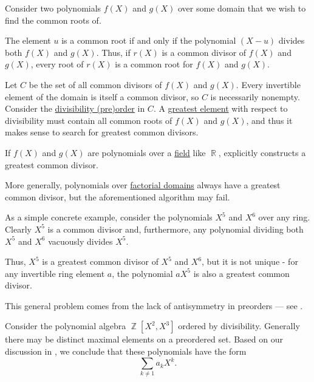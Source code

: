 \begin{example}\label{ex:common_polynomial_divisors}
  Consider two polynomials \( f(X) \) and \( g(X) \) over some domain that we wish to find the common roots of.

  The element \( u \) is a common root if and only if the polynomial \( (X - u) \) divides both \( f(X) \) and \( g(X) \). Thus, if \( r(X) \) is a common divisor of \( f(X) \) and \( g(X) \), every root of \( r(X) \) is a common root for \( f(X) \) and \( g(X) \).

  Let \( C \) be the set of all common divisors of \( f(X) \) and \( g(X) \). Every invertible element of the domain is itself a common divisor, so \( C \) is necessarily nonempty. Consider the \hyperref[thm:semiring_divisibility_order]{divisibility (pre)order} in \( C \). A \hyperref[def:extremal_points/greatest_and_least]{greatest element} with respect to divisibility must contain all common roots of \( f(X) \) and \( g(X) \), and thus it makes sense to search for greatest common divisors.

  \begin{thmenum}
     If \( f(X) \) and \( g(X) \) are polynomials over a \hyperref[def:field]{field} like \( \BbbR \),  explicitly constructs a greatest common divisor.

     More generally, polynomials over \hyperref[def:factorial_domain]{factorial domains} always have a greatest common divisor, but the aforementioned algorithm may fail.

     As a simple concrete example, consider the polynomials \( X^5 \) and \( X^6 \) over any ring. Clearly \( X^5 \) is a common divisor and, furthermore, any polynomial dividing both \( X^5 \) and \( X^6 \) vacuously divides \( X^5 \).

    Thus, \( X^5 \) is a greatest common divisor of \( X^5 \) and \( X^6 \), but it is not unique - for any invertible ring element \( a \), the polynomial \( a X^5 \) is also a greatest common divisor.

    This general problem comes from the lack of antisymmetry in preorders --- see .

     Consider the polynomial algebra \( \BbbZ[X^2, X^3] \) ordered by divisibility. Generally there may be distinct maximal elements on a preordered set. Based on our discussion in , we conclude that these polynomials have the form
    \begin{equation*}
      \sum_{k \neq 1} a_k X^k.
    \end{equation*}


\end{thmenum}
\end{example}
